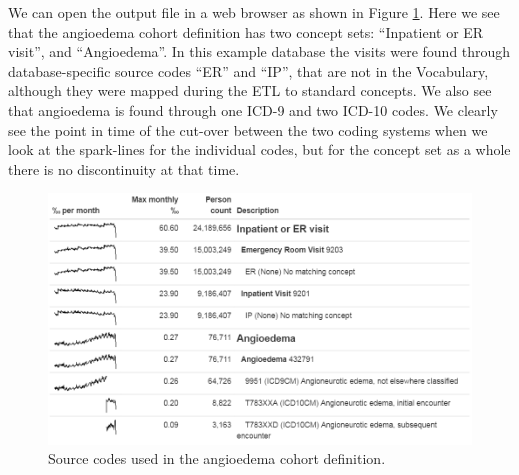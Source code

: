 \documentclass[11pt]{book}
\newenvironment{Shaded}{\begin{snugshade}}{\end{snugshade}}
\newcommand{\KeywordTok}[1]{\textcolor[rgb]{0.13,0.29,0.53}{\textbf{#1}}}
\newcommand{\DataTypeTok}[1]{\textcolor[rgb]{0.13,0.29,0.53}{#1}}
\newcommand{\StringTok}[1]{\textcolor[rgb]{0.31,0.60,0.02}{#1}}
\newcommand{\OperatorTok}[1]{\textcolor[rgb]{0.81,0.36,0.00}{\textbf{#1}}}
\newcommand{\NormalTok}[1]{#1}
\theoremstyle{definition}
\theoremstyle{definition}
\theoremstyle{definition}
\theoremstyle{remark}
\begin{document}
\begin{Shaded}
\end{Shaded}

We can open the output file in a web browser as shown in Figure
\ref{fig:sourceCodesAngioedema}. Here we see that the angioedema cohort
definition has two concept sets: ``Inpatient or ER visit'', and
``Angioedema''. In this example database the visits were found through
database-specific source codes ``ER'' and ``IP'', that are not in the
Vocabulary, although they were mapped during the ETL to standard
concepts. We also see that angioedema is found through one ICD-9 and two
ICD-10 codes. We clearly see the point in time of the cut-over between
the two coding systems when we look at the spark-lines for the
individual codes, but for the concept set as a whole there is no
discontinuity at that time.

\begin{figure}

{\centering \includegraphics[width=1\linewidth]{images/DataQuality/sourceCodesAngioedema} 

}

\caption{Source codes used in the angioedema cohort definition.}\label{fig:sourceCodesAngioedema}
\end{figure}
\end{document}
